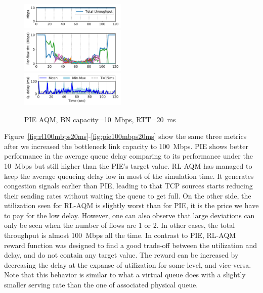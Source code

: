 \documentclass[conference]{IEEEtran}
\begin{document}
\begin{figure}[t]
\begin{center}
\includegraphics[width=0.45\textwidth]{Figures/pie_10mbps_10ms_total.pdf} \\
\includegraphics[width=0.45\textwidth]{Figures/pie_10mbps_10ms_flow.pdf} \\
\includegraphics[width=0.45\textwidth]{Figures/pie_10mbps_10ms_delay.pdf}
\end{center}
\caption{PIE AQM, BN capacity=10~Mbps, RTT=20~ms}
\label{fig:pie10mbps20ms}
\end{figure}
Figure~\ref{fig:rl100mbps20ms}-\ref{fig:pie100mbps20ms} show the same three metrics after we increased the bottleneck link capacity to 100~Mbps. PIE shows better performance in the average queue delay comparing to its performance under the 10~Mbps but still higher than the PIE's target value. RL-AQM has managed to keep the average queueing delay low in most of the simulation time. It generates congestion signals earlier than PIE, leading to that TCP sources starts reducing their sending rates without waiting the queue to get full. %
On the other side, the utilization seen for RL-AQM is slightly worst than for PIE, it is the price we have to pay for the low delay. However, one can also observe that large deviations can only be seen when the number of flows are 1 or 2. In other cases, the total throughput is almost 100~Mbps all the time. In contrast to PIE, RL-AQM reward function was designed to find a good trade-off between the utilization and delay, and do not contain any target value. The reward can be increased by decreasing the delay at the expanse of utilization for some level, and vice-versa. Note that this behavior is similar to what a virtual queue does with a slightly smaller serving rate than the one of associated physical queue.
\end{document}
